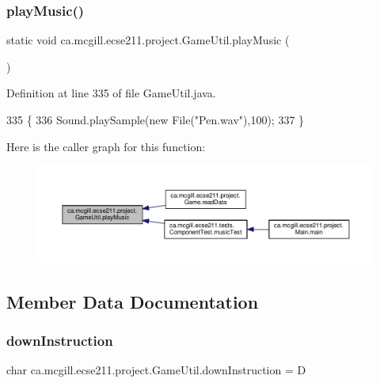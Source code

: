 \subsubsection{\texorpdfstring{play\+Music()}{playMusic()}}
{\footnotesize\ttfamily static void ca.\+mcgill.\+ecse211.\+project.\+Game\+Util.\+play\+Music (\begin{DoxyParamCaption}{ }\end{DoxyParamCaption})\hspace{0.3cm}{\ttfamily [static]}}



Definition at line 335 of file Game\+Util.\+java.


\begin{DoxyCode}
335                                  \{
336     Sound.playSample(\textcolor{keyword}{new} File(\textcolor{stringliteral}{"Pen.wav"}),100);
337   \}
\end{DoxyCode}
Here is the caller graph for this function\+:\nopagebreak
\begin{figure}[H]
\begin{center}
\leavevmode
\includegraphics[width=350pt]{classca_1_1mcgill_1_1ecse211_1_1project_1_1_game_util_a38f0e4fdf048d1c265a4b5fc712588f3_icgraph}
\end{center}
\end{figure}


\subsection{Member Data Documentation}
\mbox{\label{classca_1_1mcgill_1_1ecse211_1_1project_1_1_game_util_afc9ecf0a8a18c0abea79086801d8425a}} 
\subsubsection{\texorpdfstring{down\+Instruction}{downInstruction}}
{\footnotesize\ttfamily char ca.\+mcgill.\+ecse211.\+project.\+Game\+Util.\+down\+Instruction = \textquotesingle{}D\textquotesingle{}\hspace{0.3cm}{\ttfamily [static]}}



